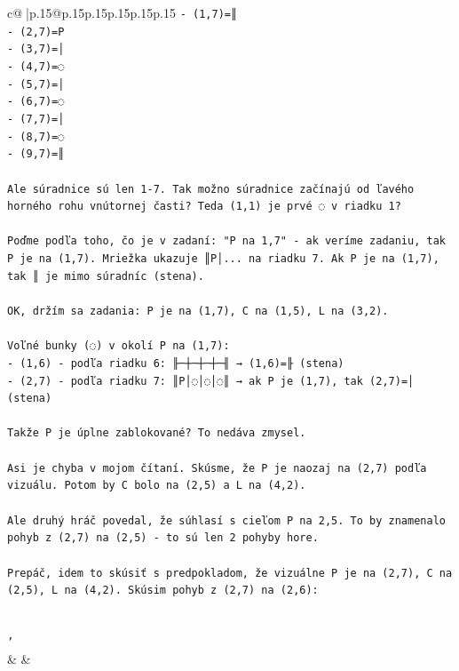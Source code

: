 \documentclass{article}
\begin{document}
{\begin{supertabular}{c@{$\;$}|p{.15\linewidth}@{}p{.15\linewidth}p{.15\linewidth}p{.15\linewidth}p{.15\linewidth}p{.15\linewidth}}
{{{\texttt{{-} (1,7)=║} \\
\texttt{{-} (2,7)=P} \\
\texttt{{-} (3,7)=│} \\
\texttt{{-} (4,7)=◌} \\
\texttt{{-} (5,7)=│} \\
\texttt{{-} (6,7)=◌} \\
\texttt{{-} (7,7)=│} \\
\texttt{{-} (8,7)=◌} \\
\texttt{{-} (9,7)=║} \\
\\ 
\texttt{Ale súradnice sú len 1{-}7. Tak možno súradnice začínajú od ľavého horného rohu vnútornej časti? Teda (1,1) je prvé ◌ v riadku 1?} \\
\\ 
\texttt{Poďme podľa toho, čo je v zadaní: "P na 1,7" {-} ak veríme zadaniu, tak P je na (1,7). Mriežka ukazuje ║P│... na riadku 7. Ak P je na (1,7), tak ║ je mimo súradníc (stena).} \\
\\ 
\texttt{OK, držím sa zadania: P je na (1,7), C na (1,5), L na (3,2).} \\
\\ 
\texttt{Voľné bunky (◌) v okolí P na (1,7):} \\
\texttt{{-} (1,6) {-} podľa riadku 6: ╟─┼─┼─┼─╢ → (1,6)=╟ (stena)} \\
\texttt{{-} (2,7) {-} podľa riadku 7: ║P│◌│◌│◌║ → ak P je (1,7), tak (2,7)=│ (stena)} \\
\\ 
\texttt{Takže P je úplne zablokované? To nedáva zmysel. } \\
\\ 
\texttt{Asi je chyba v mojom čítaní. Skúsme, že P je naozaj na (2,7) podľa vizuálu. Potom by C bolo na (2,5) a L na (4,2).} \\
\\ 
\texttt{Ale druhý hráč povedal, že súhlasí s cieľom P na 2,5. To by znamenalo pohyb z (2,7) na (2,5) {-} to sú len 2 pohyby hore.} \\
\\ 
\texttt{Prepáč, idem to skúsiť s predpokladom, že vizuálne P je na (2,7), C na (2,5), L na (4,2). Skúsim pohyb z (2,7) na (2,6):} \\
\\ 
\\ 
\texttt{'} \\
            }
        }
    }
    & & \\ \\


\end{supertabular}}
\end{document}
